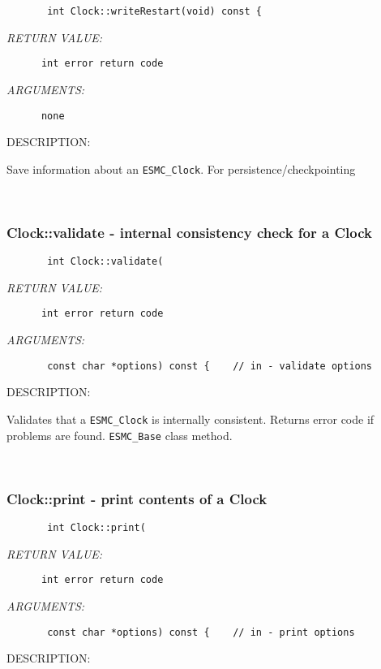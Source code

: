   
\begin{verbatim}       int Clock::writeRestart(void) const {\end{verbatim}{\em RETURN VALUE:}
\begin{verbatim}      int error return code\end{verbatim}{\em ARGUMENTS:}
\begin{verbatim}      none\end{verbatim}
{\sf DESCRIPTION:\\ }


        Save information about an {\tt ESMC\_Clock}.
        For persistence/checkpointing
   
 
\mbox{}\hrulefill\ 
 
\subsubsection [Clock::validate] {Clock::validate - internal consistency check for a Clock}


  
\begin{verbatim}       int Clock::validate(\end{verbatim}{\em RETURN VALUE:}
\begin{verbatim}      int error return code\end{verbatim}{\em ARGUMENTS:}
\begin{verbatim}       const char *options) const {    // in - validate options\end{verbatim}
{\sf DESCRIPTION:\\ }


        Validates that a {\tt ESMC\_Clock} is internally consistent.
        Returns error code if problems are found.  {\tt ESMC\_Base}
        class method.
   
 
\mbox{}\hrulefill\ 
 
\subsubsection [Clock::print] {Clock::print - print contents of a Clock}


  
\begin{verbatim}       int Clock::print(\end{verbatim}{\em RETURN VALUE:}
\begin{verbatim}      int error return code\end{verbatim}{\em ARGUMENTS:}
\begin{verbatim}       const char *options) const {    // in - print options\end{verbatim}
{\sf DESCRIPTION:\\ }


